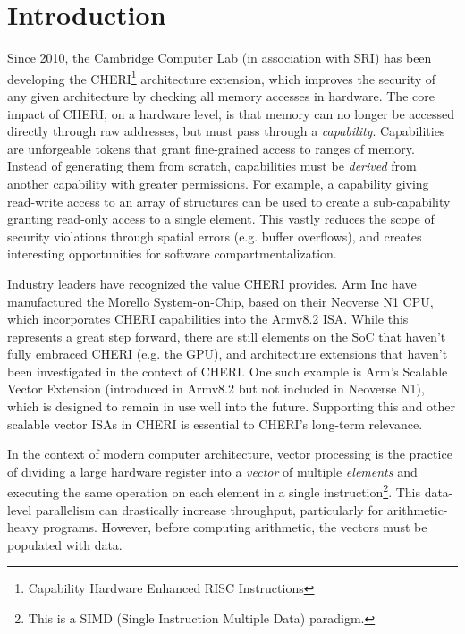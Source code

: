 \documentclass[../thesis]{subfiles}
\begin{document}
\chapter{Introduction\label{wc:start}\label{chap:intro}}

Since 2010, the Cambridge Computer Lab (in association with SRI) has been developing the CHERI\footnote{Capability Hardware Enhanced RISC Instructions} architecture extension, which improves the security of any given architecture by checking all memory accesses in hardware.
The core impact of CHERI, on a hardware level, is that memory can no longer be accessed directly through raw addresses, but must pass through a \emph{capability}\cite{TR-941}.
Capabilities are unforgeable tokens that grant fine-grained access to ranges of memory.
Instead of generating them from scratch, capabilities must be \emph{derived} from another capability with greater permissions.
For example, a capability giving read-write access to an array of structures can be used to create a sub-capability granting read-only access to a single element.
This vastly reduces the scope of security violations through spatial errors (e.g. buffer overflows\cite{szekeresSoKEternalWar2013}), and creates interesting opportunities for software compartmentalization\cite{watsonCHERIHybridCapabilitySystem2015}.

Industry leaders have recognized the value CHERI provides.
Arm Inc have manufactured the Morello System-on-Chip, based on their Neoverse N1 CPU, which incorporates CHERI capabilities into the Armv8.2 ISA.
While this represents a great step forward, there are still elements on the SoC that haven't fully embraced CHERI (e.g. the GPU), and architecture extensions that haven't been investigated in the context of CHERI.
One such example is Arm's Scalable Vector Extension (introduced in Armv8.2 but not included in Neoverse N1), which is designed to remain in use well into the future\cite{stephensARMScalableVector2017}.
Supporting this and other scalable vector ISAs in CHERI is essential to CHERI's long-term relevance.

In the context of modern computer architecture, vector processing is the practice of dividing a large hardware register into a \emph{vector} of multiple \emph{elements} and executing the same operation on each element in a single instruction\footnote{This is a SIMD (Single Instruction Multiple Data) paradigm.}.
This data-level parallelism can drastically increase throughput, particularly for arithmetic-heavy programs.
However, before computing arithmetic, the vectors must be populated with data.
\end{document}
